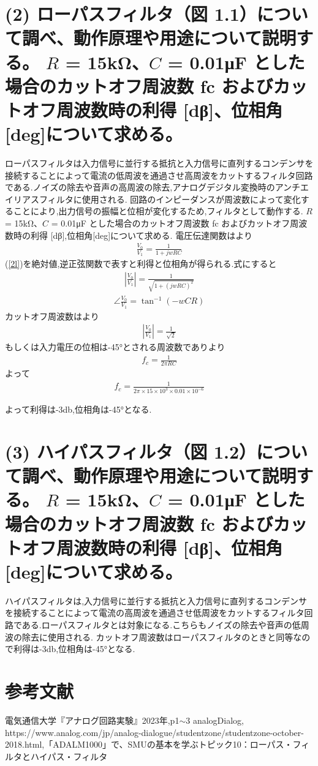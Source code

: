 \documentclass[12pt,a4j]{jarticle}
\begin{document}
\section{(2)  ローパスフィルタ（図 1.1）について調べ、動作原理や用途について説明する。 
$R$ = 15kΩ、$C$ = 0.01μF  とした場合のカットオフ周波数  fc  およびカットオフ周波数時の利得 
[dβ]、位相角[deg]について求める。}
ローパスフィルタは入力信号に並行する抵抗と入力信号に直列するコンデンサを接続することによって電流の低周波を通過させ高周波をカットするフィルタ回路である.ノイズの除去や音声の高周波の除去,アナログデジタル変換時のアンチエイリアスフィルタに使用される.
回路のインピーダンスが周波数によって変化することにより,出力信号の振幅と位相が変化するため,フィルタとして動作する.
$R$ = 15kΩ、$C$ = 0.01μF  とした場合のカットオフ周波数  fc  およびカットオフ周波数時の利得 [dβ],位相角[deg]について求める.
電圧伝達関数は\cite{a}より
\begin{eqnarray}
  \label{2l}
  \frac{V_0}{V_1}=\frac{1}{1+jwRC}
\end{eqnarray}
(\ref{2l})を絶対値,逆正弦関数で表すと利得と位相角が得られる.式にすると
\begin{eqnarray}
  \label{2l1}
  |\frac{V_0}{V_1}|=\frac{1}{\sqrt{1+(jwRC)^2}}
\end{eqnarray}
\begin{eqnarray}
  \label{2l2}
  \angle\frac{V_0}{V_1}=\tan^{-1}(-wCR)
\end{eqnarray}
カットオフ周波数は\cite{a}より
\begin{eqnarray}
  \label{2la}
  |\frac{V_0}{V_1}|=\frac{1}{\sqrt{2}}
\end{eqnarray}
もしくは入力電圧の位相は-45°とされる周波数であり\cite{a}より
\begin{eqnarray}
  \label{2lb}
  f_c = \frac{1}{2\pi{RC}}
\end{eqnarray}
 よって
 \begin{eqnarray}
  \label{2lc}
  f_c = \frac{1}{2\pi\times{15}\times{10^3}\times{0.01}\times{10^{-6}}}
\end{eqnarray}

よって利得は-3db,位相角は-45°となる.

\section{(3)  ハイパスフィルタ（図 1.2）について調べ、動作原理や用途について説明する。 
$R$ = 15kΩ、$C$ = 0.01μF  とした場合のカットオフ周波数  fc  およびカットオフ周波数時の利得 
[dβ]、位相角[deg]について求める。}
ハイパスフィルタは,入力信号に並行する抵抗と入力信号に直列するコンデンサを接続することによって電流の高周波を通過させ低周波をカットするフィルタ回路である.ローパスフィルタとは対象になる.こちらもノイズの除去や音声の低周波の除去に使用される.
カットオフ周波数はローパスフィルタのときと同等なので利得は-3db,位相角は-45°となる.

\section{参考文献}
\begin{thebibliography}{9}
   電気通信大学『アナログ回路実験』2023年,p1$\sim$3
  analogDialog, https://www.analog.com/jp/analog-dialogue/studentzone/studentzone-october-2018.html,「ADALM1000」で、SMUの基本を学ぶトピック10：ローパス・フィルタとハイパス・フィルタ
\end{thebibliography}
\end{document}
